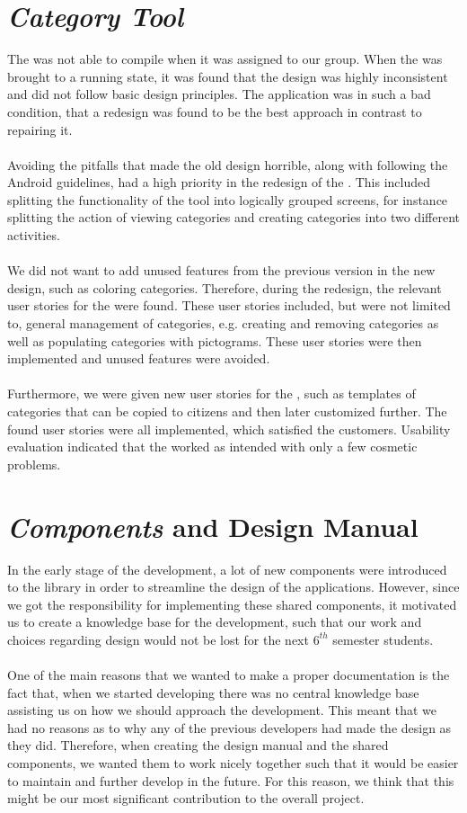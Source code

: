 \section*{\emph{Category Tool}}
The \ct was not able to compile when it was assigned to our group. When the \ct was brought to a running state, it was found that the design was highly inconsistent and did not follow basic design principles. The application was in such a bad condition, that a redesign was found to be the best approach in contrast to repairing it.
\\\\
Avoiding the pitfalls that made the old design horrible, along with following the Android guidelines, had a high priority in the redesign of the \ct. This included splitting the functionality of the tool into logically grouped screens, for instance splitting the action of viewing categories and creating categories into two different activities.
\\\\
We did not want to add unused features from the previous version in the new design, such as coloring categories. Therefore, during the redesign, the relevant user stories for the \ct were found. These user stories included, but were not limited to, general management of categories, e.g. creating and removing categories as well as populating categories with pictograms. These user stories were then implemented and unused features were avoided. 
\\\\
Furthermore, we were given new user stories for the \ct, such as templates of categories that can be copied to citizens and then later customized further. The found user stories were all implemented, which satisfied the customers. Usability evaluation indicated that the \ct worked as intended with only a few cosmetic problems.

\section*{\giraf \emph{Components} and Design Manual}
In the early stage of the development, a lot of new components were introduced to the \gc library in order to streamline the design of the \giraf applications. However, since we got the responsibility for implementing these shared components, it motivated us to create a knowledge base for the development, such that our work and choices regarding design would not be lost for the next $6^{th}$ semester students. 
\\\\
One of the main reasons that we wanted to make a proper documentation is the fact that, when we started developing there was no central knowledge base assisting us on how we should approach the development. This meant that we had no reasons as to why any of the previous \giraf developers had made the design as they did. Therefore, when creating the design manual and the shared components, we wanted them to work nicely together such that it would be easier to maintain and further develop in the future. For this reason, we think that this might be our most significant contribution to the overall project.
